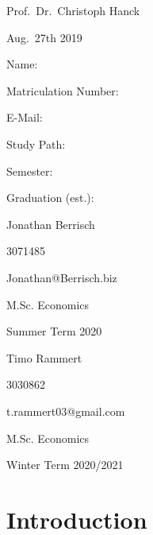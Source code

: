 \documentclass[11pt,]{article}
\begin{document}
\begin{titlepage}
  \noindent\begin{minipage}[t]{0.3\textwidth}
  \end{minipage}
  \begin{minipage}[t]{0.7\textwidth}
  \hspace{1cm}Prof.~Dr.~Christoph Hanck
  \end{minipage}

  \noindent\begin{minipage}[t]{0.3\textwidth}
  \end{minipage}
  \begin{minipage}[t]{0.7\textwidth}
  \hspace{1cm}Aug.~27th 2019
  \end{minipage}

  \hrulefill

  \begin{multicols}{3}

  Name:

  Matriculation Number:

  E-Mail:

  Study Path:

  Semester:

  Graduation (est.):

  \columnbreak

  Jonathan Berrisch

  3071485

  Jonathan@Berrisch.biz

  M.Sc. Economics


  Summer Term 2020

  \columnbreak

  Timo Rammert

  3030862

  t.rammert03@gmail.com

  M.Sc. Economics


  Winter Term 2020/2021

  \end{multicols}

\end{titlepage}


{
\hypersetup{linkcolor=black}
\setcounter{tocdepth}{3}
\tableofcontents
}
\newpage
\listoftables
{}
\newpage
\listoffigures
{}
\newpage
{}
\hypertarget{introduction}{%
\section{Introduction}\label{introduction}}
\end{document}
